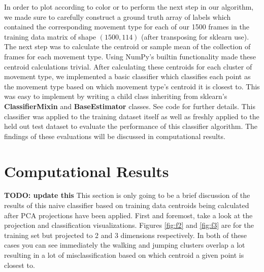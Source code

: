 \documentclass[11pt]{amsart}
\begin{document}
In order to plot according to color or to perform the next step in our algorithm, we made sure to carefully construct a ground truth array of labels which contained the corresponding movement type for each of our 1500 frames in the training data matrix of shape $(1500, 114)$ (after transposing for sklearn use).
The next step was to calculate the centroid or sample mean of the collection of frames for each movement type.
Using NumPy's builtin functionality made these centroid calculations trivial.
After calculating these centroids for each cluster of movement type, we implemented a basic classifier which classifies each point as the movement type based on which movement type's centroid it is closest to.
This was easy to implement by writing a child class inheriting from sklearn's \textbf{ClassifierMixin} and \textbf{BaseEstimator} classes.
See code for further details.
This classifier was applied to the training dataset itself as well as freshly applied to the held out test dataset to evaluate the performance of this classifier algorithm.
The findings of these evaluations will be discussed in computational results.

\section{Computational Results}\label{sec:results} \textbf{TODO: update this}
This section is only going to be a brief discussion of the results of this naive classifier based on training data centroids being calculated after PCA projections have been applied.
First and foremost, take a look at the projection and classification visualizations. Figures \ref{fig:f2} and \ref{fig:f3} are for the training set but projected to 2 and 3 dimensions respectively.
In both of these cases you can see immediately the walking and jumping clusters overlap a lot resulting in a lot of misclassification based on which centroid a given point is closest to.
\end{document}

